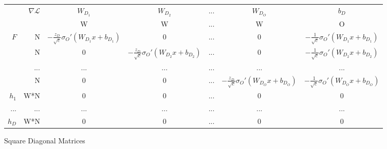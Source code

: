 \begin{tabular}{r r | c c c c c}
& $\nabla\mathcal{L}$ & $W_{D_1}$ &  $W_{D_2}$  &...&  $W_{D_O}$ & $b_D$ \\
& & W & W &...& W & O \\ \hline
$F$ & N & $-\frac{z_D}{\sqrt{c}}\sigma_O'(W_{D_1}x+b_{D_1})$ & 0 &...& 0 & $-\frac{1}{\sqrt{c}}\sigma_O'(W_{D_1}x+b_{D_1})$ \\
    & N & 0 & $-\frac{z_D}{\sqrt{c}}\sigma_O'(W_{D_2}x+b_{D_2})$ &...& 0 & $-\frac{1}{\sqrt{c}}\sigma_O'(W_{D_2}x+b_{D_2})$ \\
      &...&...&...&...&...&... \\
    & N & 0 & 0 &...& $-\frac{z_D}{\sqrt{c}}\sigma_O'(W_{D_O}x+b_{D_O})$ & $-\frac{1}{\sqrt{c}}\sigma_O'(W_{D_O}x+b_{D_O})$ \\ \hline
$h_1$ & W*N & 0 & 0 &...& 0 & 0 \\
...   & ... &...&...&...&...&...\\ 
$h_{D}$ & W*N & 0 & 0 &...& 0 & 0 \\ \hline
      
\end{tabular}

\newpage
Square Diagonal Matrices


